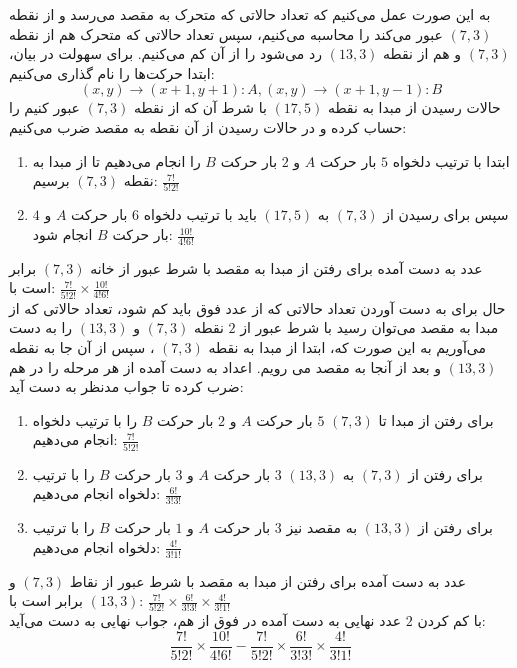 به این صورت عمل می‌کنیم که تعداد حالاتی که متحرک به مقصد می‌رسد و از نقطه 
$(7, 3)$ 
عبور می‌کند را محاسبه می‌کنیم، سپس تعداد حالاتی که متحرک هم از نقطه
$(7, 3)$ 
و هم از نقطه 
$(13, 3)$ 
رد می‌شود را از آن کم می‌کنیم. برای سهولت در بیان، ابتدا حرکت‌ها را نام گذاری می‌کنیم:
\\
\[(x ,y) \to (x + 1, y + 1) : A , (x, y) \to (x + 1, y - 1) : B\]
   حالات رسیدن از مبدا به نقطه
$(17, 5)$
     با شرط آن که از نقطه
$(7, 3)$
      عبور کنیم را حساب کرده و در حالات رسیدن از آن نقطه به مقصد ضرب می‌کنیم:
    \begin{enumerate}
        \item 
        ابتدا با ترتیب دلخواه 
$5$ 
        بار حرکت
$A$
         و
$2$ 
         بار حرکت
$B$
          را انجام می‌دهیم تا از مبدا به نقطه
$(7,3)$
           برسیم:
\(\frac{7!}{5!2!}\)
        \item
        سپس برای رسیدن از 
$(7, 3)$
         به 
$(17,5)$ 
        باید با ترتیب دلخواه
$6$ 
        بار حرکت 
$A$ 
        و 
$4$ 
        بار حرکت
$B$ 
        انجام شود:
\(\frac{10!}{4!6!}\)
    \end{enumerate}
    عدد به دست آمده برای رفتن از مبدا به مقصد با شرط عبور از خانه
$(7, 3)$ 
     برابر است با:
\(\frac{7!}{5!2!}\times\frac{10!}{4!6!}\)\\
    حال برای به دست آوردن تعداد حالاتی که از عدد فوق باید کم شود، تعداد حالاتی که از مبدا به مقصد می‌توان رسید با شرط عبور از
$2$ 
    نقطه
$(7, 3)$ 
    و
$(13, 3)$ 
     را به دست می‌آوریم به این صورت که، ابتدا از مبدا به نقطه
$(7, 3)$ 
     ، سپس از آن جا به نقطه
$(13, 3)$ 
     و بعد از آنجا به مقصد می رویم. اعداد به دست آمده از هر مرحله را در هم ضرب کرده تا جواب مدنظر به دست آید:
    \begin{enumerate}
        \item 
        برای رفتن از مبدا تا 
$(7, 3)$
$5$
          بار حرکت
$A$ 
           و
$2$ 
            بار حرکت
$B$ 
            را با ترتیب دلخواه انجام می‌دهیم:
\(\frac{7!}{5!2!}\)
        \item
        برای رفتن از 
$(7, 3)$ 
        به 
$(13, 3)$
$3$
          بار حرکت 
$A$ 
          و
$3$
           بار حرکت
$B$
            را با ترتیب دلخواه انجام می‌دهیم:
\(\frac{6!}{3!3!}\)
        \item
        برای رفتن از
$(13, 3)$
         به مقصد نیز 
$3$ 
         بار حرکت
$A$
         و
$1$ 
          بار حرکت
$B$
            را با ترتیب دلخواه انجام می‌دهیم: 
\(\frac{4!}{3!1!}\)
    \end{enumerate}
    عدد به دست آمده برای رفتن از مبدا به مقصد با شرط عبور از نقاط 
$(7, 3)$ 
    و 
$(13, 3)$ 
    برابر است با:
\(\frac{7!}{5!2!}\times\frac{6!}{3!3!}\times\frac{4!}{3!1!}\)\\
    با کم کردن 
$2$ 
    عدد نهایی به دست آمده در فوق از هم، جواب نهایی به دست می‌آید:
    \[\frac{7!}{5!2!}\times\frac{10!}{4!6!} - \frac{7!}{5!2!}\times\frac{6!}{3!3!}\times\frac{4!}{3!1!}\]